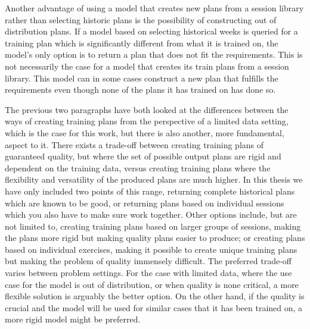 Another advantage of using a model that creates new plans from a session library rather than selecting historic plans is the possibility of constructing out of distribution plans.
If a model based on selecting historical weeks is queried for a training plan which is significantly different from what it is trained on, the model's only option is to return a plan that does not fit the requirements.
This is not necessarily the case for a model that creates its train plans from a session library.
This model can in some cases construct a new plan that fulfills the requirements even though none of the plans it has trained on has done so.

The previous two paragraphs have both looked at the differences between the ways of creating training plans from the perspective of a limited data setting, which is the case for this work, but there is also another, more fundamental, aspect to it.
There exists a trade-off between creating training plans of guaranteed quality, but where the set of possible output plans are rigid and dependent on the training data, versus creating training plans where the flexibility and versatility of the produced plans are much higher.
In this thesis we have only included two points of this range, returning complete historical plans which are known to be good, or returning plans based on individual sessions which you also have to make sure work together.
Other options include, but are not limited to, creating training plans based on larger groups of sessions, making the plans more rigid but making quality plans easier to produce; or creating plans based on individual exercises, making it possible to create unique training plans but making the problem of quality immensely difficult.
The preferred trade-off varies between problem settings.
For the case with limited data, where the use case for the model is out of distribution, or when quality is none critical, a more flexible solution is arguably the better option.
On the other hand, if the quality is crucial and the model will be used for similar cases that it has been trained on, a more rigid model might be preferred. 

